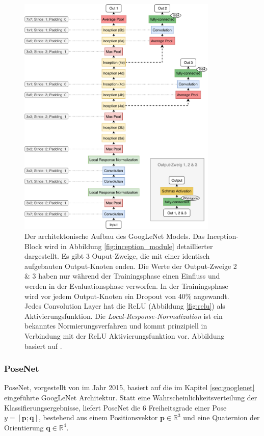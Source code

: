 \vspace*{\fill}
	 \begin{figure}[H]
		\centering
		\includegraphics[width=0.85\textwidth]{images/googlenet/googlenet_diagram.pdf}
		\caption{Der architektonische Aufbau des GoogLeNet Models. Das Inception-Block wird in Abbildung \ref{fig:inception_module} detaillierter dargestellt. Es gibt 3 Ouput-Zweige, die mit einer identisch aufgebauten Output-Knoten enden. Die Werte der Output-Zweige 2 \& 3 haben nur während der Trainingsphase einen Einfluss und werden in der Evaluationsphase verworfen. In der Trainingsphase wird vor jedem Output-Knoten ein Dropout von 40\% angewandt. Jedes Convolution Layer hat die ReLU (Abbildung \ref{fig:relu}) als Aktivierungsfunktion. Die \textit{Local-Response-Normalization} \cite{krizhevskyImageNetClassificationDeep2012a} ist ein bekanntes Normierungsverfahren und kommt prinzipiell in Verbindung mit der ReLU Aktivierungsfunktion vor. Abbildung basiert auf \cite{szegedyGoingDeeperConvolutions2015}.}
		\label{fig:googlenet}
	\end{figure}
\subsubsection{PoseNet}
\label{sec:posenet}
PoseNet, vorgestellt von \citet{kendallPoseNetConvolutionalNetwork2015} im Jahr 2015, basiert auf die im Kapitel \ref{sec:googlenet} eingeführte GoogLeNet Architektur. Statt eine Wahrscheinlichkeitsverteilung der Klassifierungsergebnisse, liefert PoseNet die 6 Freiheitsgrade einer Pose $y = [\pmb{p};\pmb{q}]$, bestehend aus einem Positionsvektor $\pmb{p} \in  \mathbb{R}^{3}$ und eine Quaternion der Orientierung $ \pmb{q} \in  \mathbb{R}^{4}$.

